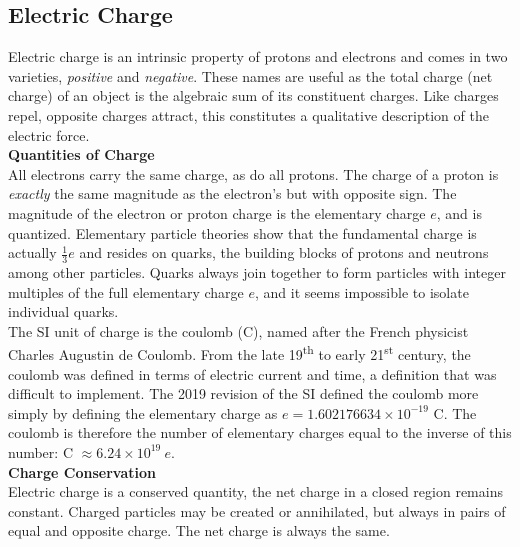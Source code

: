 \documentclass[a4paper]{article}
\let\bf\textbf
\begin{document}
\subsection{Electric Charge}
Electric charge is an intrinsic property of protons and electrons and comes in two varieties, \textit{positive} and \textit{negative}. These names are useful as the total charge (net charge) of an object is the algebraic sum of its constituent charges. Like charges repel, opposite charges attract, this constitutes a qualitative description of the electric force.
\vspace{1mm}\\
\bf{Quantities of Charge}
\vspace{1mm}\\
All electrons carry the same charge, as do all protons. The charge of a proton is \textit{exactly} the same magnitude as the electron's but with opposite sign. The magnitude of the electron or proton charge is the elementary charge $e$, and is quantized. Elementary particle theories show that the fundamental charge is actually $\frac{1}{3}e$ and resides on quarks, the building blocks of protons and neutrons among other particles. Quarks always join together to form particles with integer multiples of the full elementary charge $e$, and it seems impossible to isolate individual quarks.
\vspace{1mm}\\
The SI unit of charge is the coulomb (C), named after the French physicist Charles Augustin de Coulomb. From the late 19\textsuperscript{th} to early 21\textsuperscript{st} century, the coulomb was defined in terms of electric current and time, a definition that was difficult to implement. The 2019 revision of the SI defined the coulomb more simply by defining the elementary charge as $e = 1.602176634 \times 10^{-19}$ C. The coulomb is therefore the number of elementary charges equal to the inverse of this number: C $\approx 6.24 \times 10^{19}\ e$.
\vspace{1mm}\\
\bf{Charge Conservation}
\vspace{1mm}\\
Electric charge is a conserved quantity, the net charge in a closed region remains constant. Charged particles may be created or annihilated, but always in pairs of equal and opposite charge. The net charge is always the same.
\end{document}
